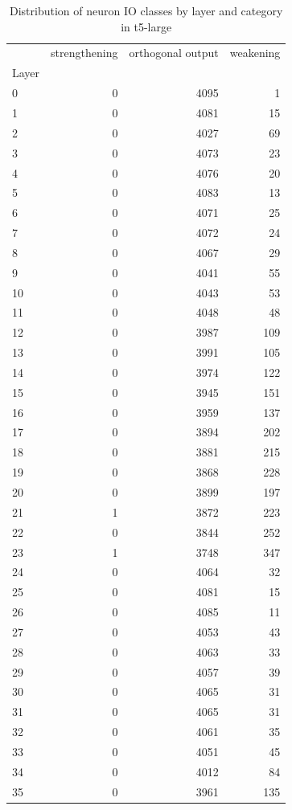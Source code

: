 \begin{table}
\caption{Distribution of neuron IO classes by layer and category in t5-large}
\label{tab:t5-large}
\begin{tabular}{lrrr}
 & strengthening & orthogonal output & weakening \\
Layer &  &  &  \\
0 & 0 & 4095 & 1 \\
1 & 0 & 4081 & 15 \\
2 & 0 & 4027 & 69 \\
3 & 0 & 4073 & 23 \\
4 & 0 & 4076 & 20 \\
5 & 0 & 4083 & 13 \\
6 & 0 & 4071 & 25 \\
7 & 0 & 4072 & 24 \\
8 & 0 & 4067 & 29 \\
9 & 0 & 4041 & 55 \\
10 & 0 & 4043 & 53 \\
11 & 0 & 4048 & 48 \\
12 & 0 & 3987 & 109 \\
13 & 0 & 3991 & 105 \\
14 & 0 & 3974 & 122 \\
15 & 0 & 3945 & 151 \\
16 & 0 & 3959 & 137 \\
17 & 0 & 3894 & 202 \\
18 & 0 & 3881 & 215 \\
19 & 0 & 3868 & 228 \\
20 & 0 & 3899 & 197 \\
21 & 1 & 3872 & 223 \\
22 & 0 & 3844 & 252 \\
23 & 1 & 3748 & 347 \\
24 & 0 & 4064 & 32 \\
25 & 0 & 4081 & 15 \\
26 & 0 & 4085 & 11 \\
27 & 0 & 4053 & 43 \\
28 & 0 & 4063 & 33 \\
29 & 0 & 4057 & 39 \\
30 & 0 & 4065 & 31 \\
31 & 0 & 4065 & 31 \\
32 & 0 & 4061 & 35 \\
33 & 0 & 4051 & 45 \\
34 & 0 & 4012 & 84 \\
35 & 0 & 3961 & 135 \\

\end{tabular}
\end{table}
